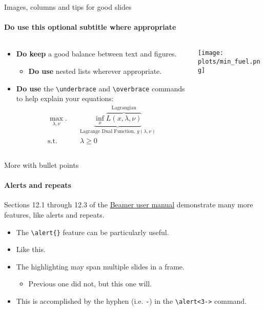 \documentclass{beamer}
\newcommand{\hrefcol}[2]{\textcolor{uihteal}{\href{#1}{#2}}}
\begin{document}
\begin{frame}[fragile]{Images, columns and tips for good slides}
\framesubtitle{\textbf{Do use} this optional subtitle where appropriate}
\begin{columns}
\begin{column}{0.7\textwidth}
\begin{itemize}
    \item \textbf{Do keep} a good balance between text and figures.
    \begin{itemize}
        \item \textbf{Do use} nested lists wherever appropriate.
    \end{itemize}
    \item \textbf{Do use} the \verb|\underbrace| and \verb|\overbrace| commands to help explain your equations:
\begin{equation*}
\begin{aligned}
\max_{\lambda, \nu}. \quad & \underbrace{\inf_x \overbrace{L(x, \lambda, \nu)}^\text{Lagrangian}}_\text{Lagrange Dual Function, $g(\lambda, \nu)$}\\
\textrm{s.t.} \quad & \lambda \geq 0
\end{aligned}
\end{equation*}
\end{itemize}


\end{column}
\begin{column}{0.3\textwidth}
\texttt{[image: plots/min\_fuel.png]}
\end{column}
\end{columns}
\end{frame}


\begin{frame}[fragile]{More with bullet points}
\framesubtitle{Alerts and repeats}
Sections 12.1 through 12.3 of the \hrefcol{https://www.ctan.org/tex-archive/macros/latex/contrib/beamer/doc/beameruserguide.pdf}{Beamer user
manual} demonstrate many more features, like alerts and repeats.
\begin{itemize}
\item The \verb|\alert{}| feature can be particularly useful.
\item Like \alert<2>{this}.
\item The highlighting may span multiple slides in a frame.
    \begin{itemize}
    \item Previous one did not, but \alert<3->{this one} will.
    \end{itemize}
\item This is accomplished by the \alert<4>{hyphen} (i.e. \texttt{-}) in the \verb|\alert<3->| command.
\end{itemize}
\end{frame}
\end{document}
